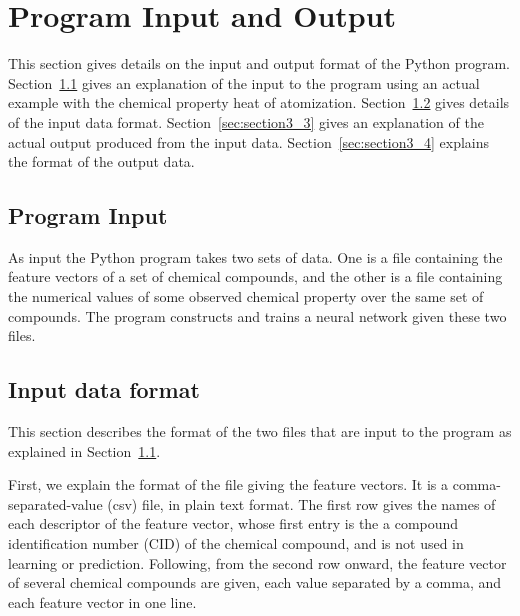 \documentclass[11pt,titlepage,dvipdfmx,twoside]{article}
\begin{document}
\newpage

\section{Program Input and Output}
\label{sec:section3}

This section gives details on the input and output format of the Python program.
Section~\ref{sec:section3_1} gives an explanation of the input to the program using 
an actual example with the chemical property heat of atomization.
Section~\ref{sec:section3_2} gives details of the input data format.
Section~\ref{sec:section3_3} gives an explanation of the actual output produced from the input data.
Section~\ref{sec:section3_4} explains the format of the output data.

\subsection{Program Input}
\label{sec:section3_1}

As input the Python program takes two sets of data.
One is a file containing the feature vectors of a set of chemical compounds, 
and the other is a file containing the numerical values of some observed chemical property
over the same set of compounds.
The program constructs and trains a neural network given these two files.

\bigskip

\subsection{Input data format}
\label{sec:section3_2}

This section describes the format of the two files that  are input
to the program as explained in Section~\ref{sec:section3_1}.

First, we explain the format of the file giving the feature vectors.
It is a comma-separated-value (csv) file, in plain text format.
The first row gives the names of each descriptor of the feature
vector, whose first entry is the a compound identification number (CID)
of the chemical compound, and is not used in learning or prediction.
Following, from the second row onward, the feature vector
of several chemical compounds are given, each value separated by a comma, 
and each feature vector in one line.

\bigskip
\end{document}
